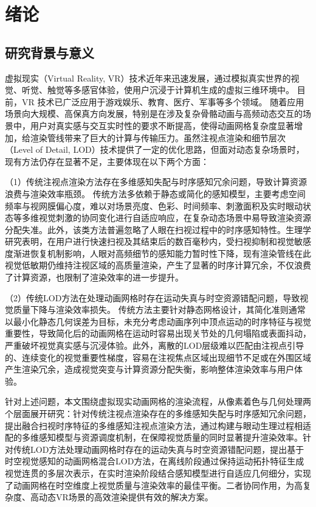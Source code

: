 \chapter{绪论}
\section{研究背景与意义}

虚拟现实（Virtual Reality, VR）技术近年来迅速发展，通过模拟真实世界的视觉、听觉、触觉等多感官体验，使用户沉浸于计算机生成的虚拟三维环境中。
目前，VR 技术已广泛应用于游戏娱乐\cite{1-1-1}、教育\cite{1-1-2}、医疗\cite{1-1-3}、军事\cite{1-1-4}等多个领域。
随着应用场景向大规模、高保真方向发展，特别是在涉及复杂骨骼动画与高频动态交互的场景中，用户对真实感与交互实时性的要求不断提高，使得动画网格复杂度显著增加，给渲染管线带来了巨大的计算与传输压力。虽然注视点渲染\cite{1-1-5}和细节层次（Level of Detail, LOD）技术\cite{1-1-5-1}提供了一定的优化思路，但面对动态复杂场景时，现有方法仍存在显著不足，主要体现在以下两个方面：

（1）传统注视点渲染方法存在多维感知失配与时序感知冗余问题，导致计算资源浪费与渲染效率瓶颈。
传统方法多依赖于静态或简化的感知模型，主要考虑空间频率与视网膜偏心度，难以对场景亮度、色彩、时间频率、刺激面积及实时眼动状态等多维视觉刺激的协同变化进行自适应响应，在复杂动态场景中易导致渲染资源分配失准\cite{1-1-7}。此外，该类方法普遍忽略了人眼在扫视过程中的时序感知特性。生理学研究表明，在用户进行快速扫视及其结束后的数百毫秒内，受扫视抑制和视觉敏感度渐进恢复机制影响，人眼对高频细节的感知能力暂时性下降，现有渲染管线在此视觉低敏期仍维持注视区域的高质量渲染，产生了显著的时序计算冗余，不仅浪费了计算资源，也限制了渲染效率的进一步提升\cite{1-1-8}。

（2）传统LOD方法在处理动画网格时存在运动失真与时空资源错配问题，导致视觉质量下降与渲染效率损失。
传统方法主要针对静态网格设计，其简化准则通常以最小化静态几何误差为目标，未充分考虑动画序列中顶点运动的时序特征与视觉重要性，导致简化后的动画网格在运动时容易出现关节处的几何塌陷或表面抖动，严重破坏视觉真实感与沉浸体验\cite{1-1-9}。此外，离散的LOD层级难以匹配由注视点引导的、连续变化的视觉重要性梯度，容易在注视焦点区域出现细节不足或在外围区域产生渲染冗余，造成视觉突变与计算资源分配失衡，影响整体渲染效率与用户体验\cite{1-1-10}。

针对上述问题，本文围绕虚拟现实动画网格的渲染流程，从像素着色与几何处理两个层面展开研究：针对传统注视点渲染存在的多维感知失配与时序感知冗余问题，提出融合扫视时序特征的多维感知注视点渲染方法，通过构建与眼动生理过程相适配的多维感知模型与资源调度机制，在保障视觉质量的同时显著提升渲染效率。针对传统LOD方法处理动画网格时存在的运动失真与时空资源错配问题，提出基于时空视觉感知的动画网格混合LOD方法，在离线阶段通过保持运动拓扑特征生成视觉连贯的多层次表示，在实时渲染阶段结合感知模型进行自适应几何细分，实现了动画网格在时空维度上视觉质量与渲染效率的最佳平衡。二者协同作用，为高复杂度、高动态VR场景的高效渲染提供有效的解决方案。

